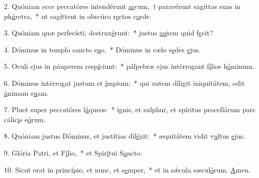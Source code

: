 2. Quóniam ecce peccatóres intendérunt \uline{ar}cum,~† paravérunt sagíttas suas in ph\uline{á}retra,~* ut sagíttent in obscúro r\uline{e}ctos c\uline{o}rde.\par 
3. Quóniam quæ perfecísti, destrux\uline{é}runt:~* justus \uline{au}tem quid f\uline{e}cit?\par 
4. Dóminus in templo sancto s\uline{u}o,~* Dóminus in cælo s\uline{e}des \uline{e}jus.\par 
5. Oculi ejus in páuperem resp\uline{í}ciunt:~* pálpebræ ejus intérrogant f\uline{í}lios h\uline{ó}minum.\par 
6. Dóminus intérrogat justum et \uline{í}mpium:~* qui autem díligit iniquitátem, odit \uline{á}nimam s\uline{u}am.\par 
7. Pluet super peccatóres l\uline{á}queos:~* ignis, et sulphur, et spíritus procellárum pars cálic\uline{i}s e\uline{ó}rum.\par 
8. Quóniam justus Dóminus, et justítias dil\uline{é}xit:~* æquitátem vidit v\uline{u}ltus \uline{e}jus.\par 
9. Glória Patri, et F\uline{í}lio,~* et Spir\uline{í}tui S\uline{a}ncto.\par 
10. Sicut erat in princípio, et nunc, et s\uline{e}mper,~* et in sǽcula sæcul\uline{ó}rum. \uline{A}men.\par 
